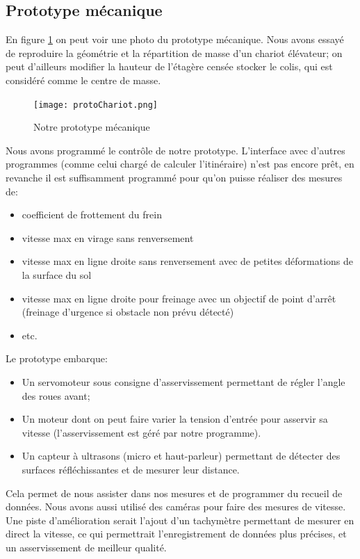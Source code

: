 \subsection{Prototype mécanique}
En figure \ref{fig:photoProtoMeca} on peut voir une photo du prototype mécanique. Nous avons essayé de reproduire la géométrie et la répartition de masse d'un chariot élévateur; on peut d'ailleurs modifier la hauteur de l'étagère censée stocker le colis, qui est considéré comme le centre de masse.
\begin{figure}
	\centering
	\texttt{[image: protoChariot.png]}
	\caption{Notre prototype mécanique}
	\label{fig:photoProtoMeca}
\end{figure}
Nous avons programmé le contrôle de notre prototype. L'interface avec d'autres programmes (comme celui chargé de calculer l'itinéraire) n'est pas encore prêt, en revanche il est suffisamment programmé pour qu'on puisse réaliser des mesures de:
\begin{itemize}
	\item coefficient de frottement du frein
	\item vitesse max en virage sans renversement
	\item vitesse max en ligne droite sans renversement avec de petites déformations de la surface du sol
	\item vitesse max en ligne droite pour freinage avec un objectif de point d'arrêt (freinage d'urgence si obstacle non prévu détecté)
	\item etc.
\end{itemize}
Le prototype embarque:
\begin{itemize}
	\item Un servomoteur sous consigne d'asservissement permettant de régler l'angle des roues avant;
	\item Un moteur dont on peut faire varier la tension d'entrée pour asservir sa vitesse (l'asservissement est géré par notre programme).
	\item Un capteur à ultrasons (micro et haut-parleur) permettant de détecter des surfaces réfléchissantes et de mesurer leur distance.
\end{itemize}
Cela permet de nous assister dans nos mesures et de programmer du recueil de données. Nous avons aussi utilisé des caméras pour faire des mesures de vitesse. Une piste d'amélioration serait l'ajout d'un tachymètre permettant de mesurer en direct la vitesse, ce qui permettrait l'enregistrement de données plus précises, et un asservissement de meilleur qualité.\\
